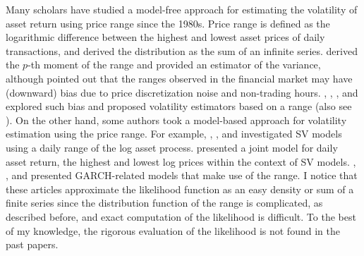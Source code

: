 \documentclass[11pt]{article}
\begin{document}
Many scholars have studied a model-free approach for estimating the volatility of asset return using price range since the 1980s. 
Price range is defined as the logarithmic difference between the highest and lowest asset prices of daily transactions, and \cite{Feller(1951)} derived the distribution as the sum of an infinite series.
\cite{Parkinson(1980)} derived the $p$-th moment of the range and provided an estimator of the variance, although \cite{GarmanKlass(1980)} pointed out that the ranges observed in the financial market may have (downward) bias due to price discretization noise and non-trading hours. 
\cite{GarmanKlass(1980)}, \cite{RogersSatchell(1991)}, \cite{Kunitomo(1992)}, and \cite{YangZhang(2000)}
explored such bias and proposed volatility estimators based on a range (also see \cite{Molnar(2012)}). 
On the other hand, some authors took a model-based approach for volatility estimation using the price range. 
For example, \cite{Gallant_etal(1999)}, \cite{Alizadeh_etal(2002)}, and \cite{BrandtJones(2005)} investigated SV models using a daily range of the log asset process. 
\cite{Horst_etal(2011)} presented a joint model for daily asset return, the highest and lowest log prices within the context of SV models. 
\cite{Chou(2005)}, \cite{BrandtJones(2006)}, and \cite{Chen_etal(2008)} presented GARCH-related models that make use of the range. 
I notice that these articles approximate the likelihood function as an easy density or sum of a finite series since the distribution function of the range is complicated, as described before, and exact computation of the likelihood is difficult. 
To the best of my knowledge, the rigorous evaluation of the likelihood is not found in the past papers.  
\end{document}
